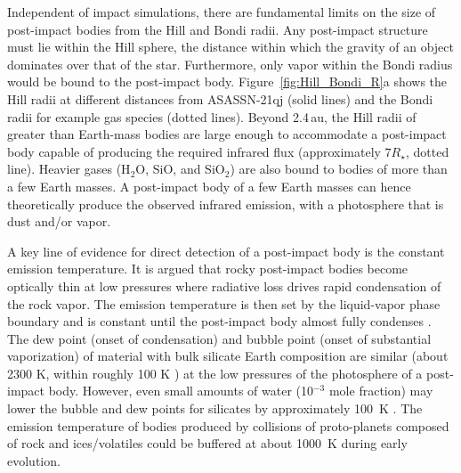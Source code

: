 \documentclass[sn-nature,oneside]{sn-jnl}%
\begin{document}
Independent of impact simulations, there are fundamental limits on the size of post-impact bodies from the Hill and Bondi radii.
%
Any post-impact structure must lie within the Hill sphere, the distance within which the gravity of an object dominates over that of the star.
%
Furthermore, only vapor within the Bondi radius would be bound to the post-impact body.
%
Figure~\ref{fig:Hill_Bondi_R}a shows the Hill radii at different distances from ASASSN-21qj (solid lines) and the Bondi radii for example gas species (dotted lines).
%
Beyond 2.4\,au, the Hill radii of greater than Earth-mass bodies are large enough to accommodate a post-impact body capable of producing the required infrared flux (approximately $7R_\star$, dotted line). 
%
Heavier gases (H$_2$O, SiO, and SiO$_2$) are also bound to bodies of more than a few Earth masses.
%
A post-impact body of a few Earth masses can hence theoretically produce the observed infrared emission, with a photosphere that is dust and/or vapor.



A key line of evidence for direct detection of a post-impact body is the constant emission temperature.
%
It is argued \cite{Lock18} that rocky post-impact bodies become optically thin at low pressures where radiative loss drives rapid condensation of the rock vapor.
%
The emission temperature is then set by the liquid-vapor phase boundary and is constant until the post-impact body almost fully condenses \cite{Lock18,Caracas2023}.
%
The dew point (onset of condensation) and bubble point (onset of substantial vaporization) of material with bulk silicate Earth composition are similar (about 2300 K, within roughly 100 K \cite[][]{Lock18,Fegley2023_BSE_cond}) at the low pressures of the photosphere of a post-impact body.
%
However, even small amounts of water (10$^{-3}$ mole fraction) may lower the bubble and dew points for silicates by approximately 100~K \cite[][]{Fegley2023_BSE_cond,Lock18}. 
%
The emission temperature of bodies produced by collisions of proto-planets composed of rock and ices/volatiles could be buffered at about 1000~K during early evolution.


\end{document}
